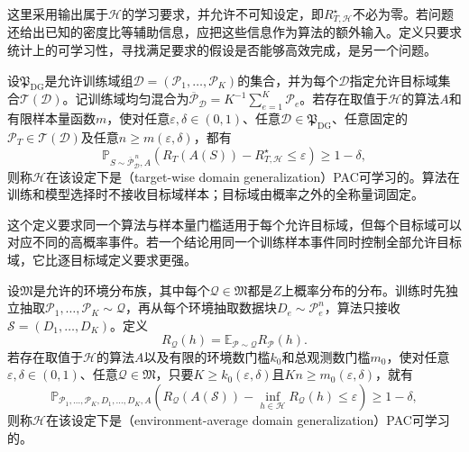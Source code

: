 这里采用输出属于$\mathcal H$的学习要求，并允许不可知设定，即$R_{T,\mathcal H}^{\star}$不必为零。若问题还给出已知的密度比等辅助信息，应把这些信息作为算法的额外输入。定义只要求统计上的可学习性，寻找满足要求的假设是否能够高效完成，是另一个问题。

\begin{definition}[逐目标域领域泛化PAC可学习性]
\label{def:targetwise-domain-generalization-pac}
设$\mathfrak P_{\mathrm{DG}}$是允许训练域组$\mathcal D=(\mathcal P_1,\ldots,\mathcal P_K)$的集合，并为每个$\mathcal D$指定允许目标域集合$\mathcal T(\mathcal D)$。记训练域均匀混合为$\overline{\mathcal P}_{\mathcal D}=K^{-1}\sum_{e=1}^K\mathcal P_e$。若存在取值于$\mathcal H$的算法$A$和有限样本量函数$m$，使对任意$\varepsilon,\delta\in(0,1)$、任意$\mathcal D\in\mathfrak P_{\mathrm{DG}}$、任意固定的$\mathcal P_T\in\mathcal T(\mathcal D)$及任意$n\geq m(\varepsilon,\delta)$，都有
\[
 \mathbb P_{S\sim\overline{\mathcal P}_{\mathcal D}^{\,n},A}\!\left(
 R_T(A(S))-R_{T,\mathcal H}^{\star}\leq\varepsilon
 \right)\geq1-\delta,
\]
则称$\mathcal H$在该设定下是（target-wise domain generalization）PAC可学习的。算法在训练和模型选择时不接收目标域样本；目标域由概率之外的全称量词固定。
\end{definition}

这个定义要求同一个算法与样本量门槛适用于每个允许目标域，但每个目标域可以对应不同的高概率事件。若一个结论用同一个训练样本事件同时控制全部允许目标域，它比逐目标域定义要求更强。

\begin{definition}[环境平均领域泛化PAC可学习性]
\label{def:environment-average-domain-generalization-pac}
设$\mathfrak M$是允许的环境分布族，其中每个$\mathcal Q\in\mathfrak M$都是$Z$上概率分布的分布。训练时先独立抽取$\mathcal P_1,\ldots,\mathcal P_K\sim\mathcal Q$，再从每个环境抽取数据块$D_e\sim\mathcal P_e^n$，算法只接收$\mathcal S=(D_1,\ldots,D_K)$。定义
\[
 R_{\mathcal Q}(h)=\mathbb E_{\mathcal P\sim\mathcal Q}R_{\mathcal P}(h).
\]
若存在取值于$\mathcal H$的算法$A$以及有限的环境数门槛$k_0$和总观测数门槛$m_0$，使对任意$\varepsilon,\delta\in(0,1)$、任意$\mathcal Q\in\mathfrak M$，只要$K\geq k_0(\varepsilon,\delta)$且$Kn\geq m_0(\varepsilon,\delta)$，就有
\[
 \mathbb P_{\mathcal P_1,\ldots,\mathcal P_K,D_1,\ldots,D_K,A}\!\left(
 R_{\mathcal Q}(A(\mathcal S))-\inf_{h\in\mathcal H}R_{\mathcal Q}(h)
 \leq\varepsilon
 \right)\geq1-\delta,
\]
则称$\mathcal H$在该设定下是（environment-average domain generalization）PAC可学习的。
\end{definition}

